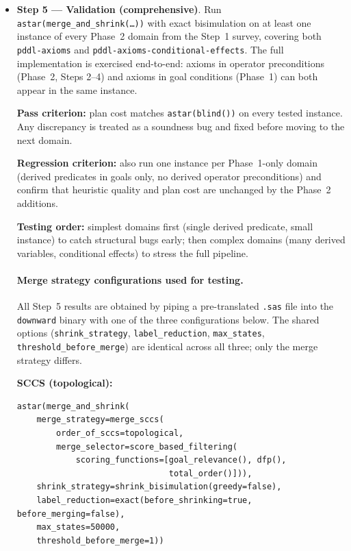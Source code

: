 \documentclass[11pt,a4paper]{article}
\begin{document}
\begin{itemize}
    Step~4 preserves the perfect heuristic ($h_{\mathrm{init}} = 6 = h^*$)
    and the same 7-state search trace as Step~3.  The heuristic decrements by
    exactly~1 at each expansion, matching the optimal plan length with no
    backtracking.  Build time is essentially unchanged (0.047\,s total),
    confirming that the Step~4 evaluation loop adds negligible overhead when no
    qualifying $d'$ preconditions exist.

  \item \textbf{Step 5 — Validation (comprehensive)}.
    Run \texttt{astar(merge\_and\_shrink(\ldots))} with exact bisimulation on
    at least one instance of every Phase~2 domain from the Step~1 survey,
    covering both \texttt{pddl-axioms} and \texttt{pddl-axioms-conditional-effects}.
    The full implementation is exercised end-to-end: axioms in operator
    preconditions (Phase~2, Steps 2--4) and axioms in goal conditions (Phase~1)
    can both appear in the same instance.

    \textbf{Pass criterion:} plan cost matches \texttt{astar(blind())} on
    every tested instance.  Any discrepancy is treated as a soundness bug and
    fixed before moving to the next domain.

    \textbf{Regression criterion:} also run one instance per Phase~1-only domain
    (derived predicates in goals only, no derived operator preconditions) and
    confirm that heuristic quality and plan cost are unchanged by the Phase~2
    additions.

    \textbf{Testing order:} simplest domains first (single derived predicate,
    small instance) to catch structural bugs early; then complex domains (many
    derived variables, conditional effects) to stress the full pipeline.

    \paragraph{Merge strategy configurations used for testing.}

    All Step~5 results are obtained by piping a pre-translated \texttt{.sas}
    file into the \texttt{downward} binary with one of the three configurations
    below.  The shared options (\texttt{shrink\_strategy},
    \texttt{label\_reduction}, \texttt{max\_states},
    \texttt{threshold\_before\_merge}) are identical across all three; only
    the merge strategy differs.

    \medskip
    \noindent\textbf{SCCS (topological):}
\begin{lstlisting}
astar(merge_and_shrink(
    merge_strategy=merge_sccs(
        order_of_sccs=topological,
        merge_selector=score_based_filtering(
            scoring_functions=[goal_relevance(), dfp(),
                               total_order()])),
    shrink_strategy=shrink_bisimulation(greedy=false),
    label_reduction=exact(before_shrinking=true, before_merging=false),
    max_states=50000,
    threshold_before_merge=1))
\end{lstlisting}


\end{itemize}
\end{document}
